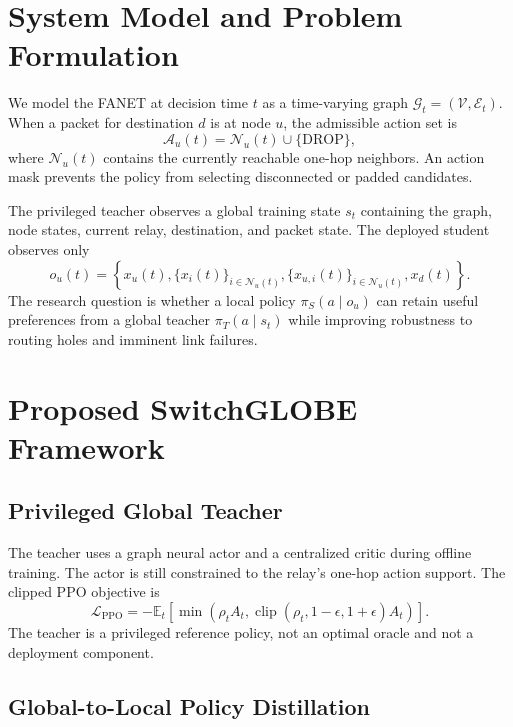 \documentclass[preprint,12pt]{elsarticle}
\begin{document}
\section{System Model and Problem Formulation}

We model the FANET at decision time $t$ as a time-varying graph $\mathcal{G}_t=(\mathcal{V},\mathcal{E}_t)$. When a packet for destination $d$ is at node $u$, the admissible action set is
\begin{equation}
    \mathcal{A}_u(t)=\mathcal{N}_u(t)\cup\{\mathrm{DROP}\},
\end{equation}
where $\mathcal{N}_u(t)$ contains the currently reachable one-hop neighbors. An action mask prevents the policy from selecting disconnected or padded candidates.

The privileged teacher observes a global training state $s_t$ containing the graph, node states, current relay, destination, and packet state. The deployed student observes only
\begin{equation}
o_u(t)=\left\{x_u(t),\{x_i(t)\}_{i\in\mathcal{N}_u(t)},
\{x_{u,i}(t)\}_{i\in\mathcal{N}_u(t)},x_d(t)\right\}.
\end{equation}
The research question is whether a local policy $\pi_S(a\mid o_u)$ can retain useful preferences from a global teacher $\pi_T(a\mid s_t)$ while improving robustness to routing holes and imminent link failures.

\section{Proposed SwitchGLOBE Framework}

\subsection{Privileged Global Teacher}

The teacher uses a graph neural actor and a centralized critic during offline training. The actor is still constrained to the relay's one-hop action support. The clipped PPO objective is
\begin{equation}
\mathcal{L}_{\mathrm{PPO}}=-\mathbb{E}_t\!\left[
\min\left(\rho_t A_t,
\operatorname{clip}(\rho_t,1-\epsilon,1+\epsilon)A_t\right)\right].
\end{equation}
The teacher is a privileged reference policy, not an optimal oracle and not a deployment component.

\subsection{Global-to-Local Policy Distillation}
\end{document}
